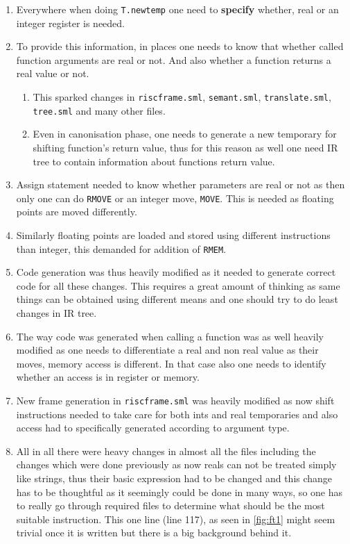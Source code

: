 \begin{enumerate}
	\item Everywhere when doing \texttt{T.newtemp} one need to \textbf{specify} whether, real or an integer register is needed.
	\item To provide this information, in places one needs to know that whether called function arguments are real or not. And also whether a function returns a real value or not.
	      \begin{enumerate}
		      \item This sparked changes in \texttt{riscframe.sml}, \texttt{semant.sml}, \texttt{translate.sml}, \texttt{tree.sml} and many other files.
		      \item Even in canonisation phase, one needs to generate a new temporary for shifting function's return value, thus for this reason as well one need IR tree to contain information about functions return value.
	      \end{enumerate}
	\item Assign statement needed to know whether parameters are real or not as then only one can do \texttt{RMOVE} or an integer move, \texttt{MOVE}. This is needed as floating points are moved differently.
	\item Similarly floating points are loaded and stored using different instructions than integer, this demanded for addition of \texttt{RMEM}.
	\item Code generation was thus heavily modified as it needed to generate correct code for all these changes. This requires a great amount of thinking as same things can be obtained using different means and one should try to do least changes in IR tree.
	\item The way code was generated when calling a function was as well heavily modified as one needs to differentiate a real and non real value as their moves, memory access is different. In that case also one needs to identify whether an access is in register or memory.
	\item New frame generation in \texttt{riscframe.sml} was heavily modified as now shift instructions needed to take care for both ints and real temporaries and also access had to specifically generated according to argument type.
	\item All in all there were heavy changes in almost all the files including the changes which were done previously as now reals can not be treated simply like strings, thus their basic expression had to be changed and this change has to be thoughtful as it seemingly could be done in many ways, so one has to really go through required files to determine what should be the most suitable instruction. This one line (line 117), as seen in \ref{fig:ft1} might seem trivial once it is written but there is a big background behind it.

\end{enumerate}
